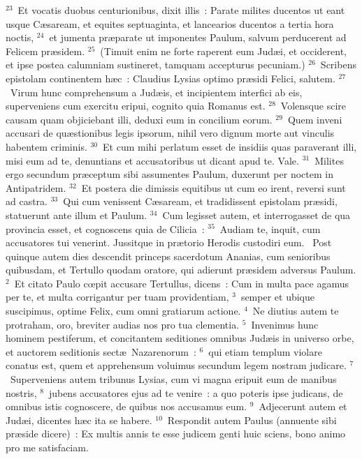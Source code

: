 ${}^{23}$~Et vocatis duobus centurionibus, dixit illis~: Parate milites ducentos ut eant usque C\ae saream, et equites septuaginta, et lancearios ducentos a tertia hora noctis,
${}^{24}$~et jumenta pr\ae parate ut imponentes Paulum, salvum perducerent ad Felicem pr\ae sidem.
${}^{25}$~(Timuit enim ne forte raperent eum Jud\ae i, et occiderent, et ipse postea calumniam sustineret, tamquam accepturus pecuniam.)
${}^{26}$~Scribens epistolam continentem h\ae c~: Claudius Lysias optimo pr\ae sidi Felici, salutem.
${}^{27}$~Virum hunc comprehensum a Jud\ae is, et incipientem interfici ab eis, superveniens cum exercitu eripui, cognito quia Romanus est.
${}^{28}$~Volensque scire causam quam objiciebant illi, deduxi eum in concilium eorum.
${}^{29}$~Quem inveni accusari de qu\ae stionibus legis ipsorum, nihil vero dignum morte aut vinculis habentem criminis.
${}^{30}$~Et cum mihi perlatum esset de insidiis quas paraverant illi, misi eum ad te, denuntians et accusatoribus ut dicant apud te. Vale.
${}^{31}$~Milites ergo secundum pr\ae ceptum sibi assumentes Paulum, duxerunt per noctem in Antipatridem.
${}^{32}$~Et postera die dimissis equitibus ut cum eo irent, reversi sunt ad castra.
${}^{33}$~Qui cum venissent C\ae saream, et tradidissent epistolam pr\ae sidi, statuerunt ante illum et Paulum.
${}^{34}$~Cum legisset autem, et interrogasset de qua provincia esset, et cognoscens quia de Cilicia~:
${}^{35}$~Audiam te, inquit, cum accusatores tui venerint. Jussitque in pr\ae torio Herodis custodiri eum.
~Post quinque autem dies descendit princeps sacerdotum Ananias, cum senioribus quibusdam, et Tertullo quodam oratore, qui adierunt pr\ae sidem adversus Paulum.
${}^{2}$~Et citato Paulo cœpit accusare Tertullus, dicens~: Cum in multa pace agamus per te, et multa corrigantur per tuam providentiam,
${}^{3}$~semper et ubique suscipimus, optime Felix, cum omni gratiarum actione.
${}^{4}$~Ne diutius autem te protraham, oro, breviter audias nos pro tua clementia.
${}^{5}$~Invenimus hunc hominem pestiferum, et concitantem seditiones omnibus Jud\ae is in universo orbe, et auctorem seditionis sect\ae\ Nazarenorum~:
${}^{6}$~qui etiam templum violare conatus est, quem et apprehensum voluimus secundum legem nostram judicare.
${}^{7}$~Superveniens autem tribunus Lysias, cum vi magna eripuit eum de manibus nostris,
${}^{8}$~jubens accusatores ejus ad te venire~: a quo poteris ipse judicans, de omnibus istis cognoscere, de quibus nos accusamus eum.
${}^{9}$~Adjecerunt autem et Jud\ae i, dicentes h\ae c ita se habere.
${}^{10}$~Respondit autem Paulus (annuente sibi pr\ae side dicere)~: Ex multis annis te esse judicem genti huic sciens, bono animo pro me satisfaciam.
